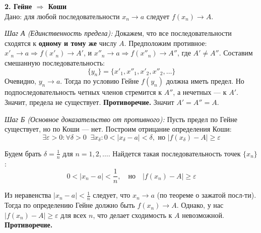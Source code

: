 \begin{tcolorbox}[title=Доказательство]
	\textbf{2. Гейне $\Rightarrow$ Коши} \\
	Дано: для любой последовательности $x_n \to a$ следует $f(x_n) \to A$.
	
	\textit{Шаг А (Единственность предела):} Докажем, что все последовательности сходятся к \textbf{одному и тому же} числу $A$.
	Предположим противное: $x'_n \to a \Rightarrow f(x'_n) \to A'$, и $x''_n \to a \Rightarrow f(x''_n) \to A''$, где $A' \neq A''$.
	Составим смешанную последовательность:
	\[ \{y_n\} = \{x'_1, x''_1, x'_2, x''_2, \dots \} \]
	Очевидно, $y_n \to a$. Тогда по условию Гейне $f(y_n)$ должна иметь предел. Но подпоследовательность четных членов стремится к $A''$, а нечетных — к $A'$. Значит, предела не существует. \textbf{Противоречие.} Значит $A' = A'' = A$.

	\textit{Шаг Б (Основное доказательство от противного):}
	Пусть предел по Гейне существует, но по Коши — нет.
	Построим отрицание определения Коши:
	\[ \exists \varepsilon > 0: \forall \delta > 0 \;\; \exists x_\delta: 0 < |x_\delta - a| < \delta, \text{ но } |f(x_\delta) - A| \ge \varepsilon \]
	
	Будем брать $\delta = \frac{1}{n}$ для $n=1, 2, \dots$.
	Найдется такая последовательность точек $\{x_n\}$:
	\[ 0 < |x_n - a| < \frac{1}{n}, \quad \text{но} \quad |f(x_n) - A| \ge \varepsilon \]
	
	Из неравенства $|x_n - a| < \frac{1}{n}$ следует, что $x_n \to a$ (по теореме о зажатой посл-ти).
	Тогда по определению Гейне должно быть $f(x_n) \to A$.
	Однако, у нас $|f(x_n) - A| \ge \varepsilon$ для всех $n$, что делает сходимость к $A$ невозможной.
	\textbf{Противоречие.}
\end{tcolorbox}
